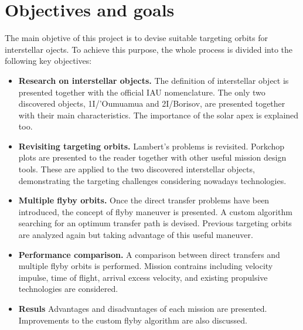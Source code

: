 \section{Objectives and goals}

The main objetive of this project is to devise suitable targeting orbits for
interstellar ojects. To achieve this purpose, the whole process is divided
into the following key objectives:

\begin{itemize}

  \item \textbf{Research on interstellar objects.}
        The definition of interstellar object is presented together with the
        official IAU nomenclature. The only two discovered objects,
        1I/'Oumuamua and 2I/Borisov, are presented together with their main
        characteristics. The importance of the solar apex is explained
        too.

  \item \textbf{Revisiting targeting orbits.}
        Lambert's problems is revisited. Porkchop plots are presented to the
        reader together with other useful mission design tools. These are
        applied to the two discovered interstellar objects, demonstrating the
        targeting challenges considering nowadays technologies.

  \item \textbf{Multiple flyby orbits.}
        Once the direct transfer problems have been introduced, the concept of
        flyby maneuver is presented. A custom algorithm searching for an
        optimum transfer path is devised. Previous targeting orbits are
        analyzed again but taking advantage of this useful maneuver.

  \item \textbf{Performance comparison.}
        A comparison between direct transfers and multiple flyby orbits is
        performed. Mission contrains including velocity impulse, time of
        flight, arrival excess velocity, and existing propulsive technologies
        are considered.

  \item \textbf{Resuls}
        Advantages and disadvantages of each mission are presented. Improvements
        to the custom flyby algorithm are also discussed.
\end{itemize}
